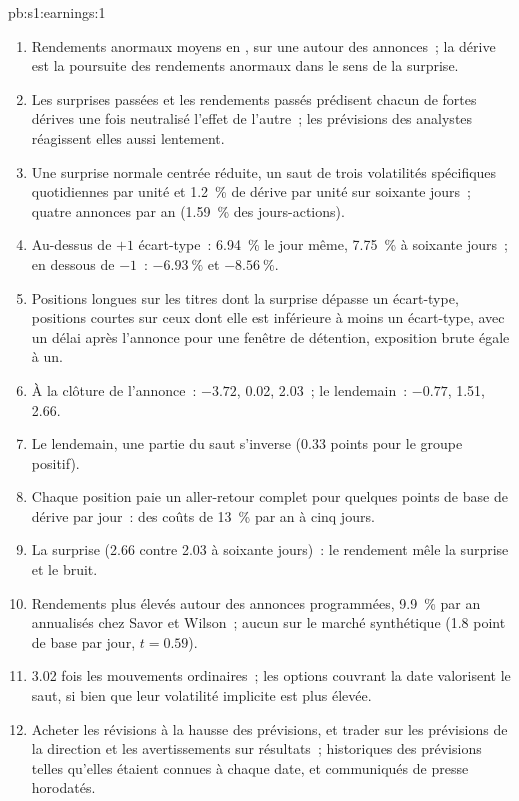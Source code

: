 \begin{solution}{pb:s1:earnings:1}
\begin{enumerate}
\item Rendements anormaux moyens en , sur une  autour des annonces~; la dérive est la poursuite des rendements anormaux dans le sens de la surprise.
\item Les surprises passées et les rendements passés prédisent chacun de fortes dérives une fois neutralisé l'effet de l'autre~; les prévisions des analystes réagissent elles aussi lentement.
\item Une surprise normale centrée réduite, un saut de trois volatilités spécifiques quotidiennes par unité et 1.2~\% de dérive par unité sur soixante jours~; quatre annonces par an
(1.59~\% des jours-actions).
\item Au-dessus de $+1$ écart-type~: 6.94~\% le jour même, 7.75~\% à soixante jours~; en dessous de $-1$~: $-6.93~\%$ et $-8.56~\%$.
\item Positions longues sur les titres dont la surprise dépasse un écart-type, positions courtes sur ceux dont elle est inférieure à moins un écart-type, avec un délai après l'annonce pour une fenêtre de détention,
exposition brute égale à un.
\item À la clôture de l'annonce~: $-3.72$, 0.02, 2.03~; le lendemain~: $-0.77$, 1.51, 2.66.
\item Le lendemain, une partie du saut s'inverse (0.33 points pour le groupe positif).
\item Chaque position paie un aller-retour complet pour quelques points de base de dérive par jour~: des coûts de 13~\% par an à cinq jours.
\item La surprise (2.66 contre 2.03 à soixante jours)~: le rendement mêle la surprise et le bruit.
\item Rendements plus élevés autour des annonces programmées, 9.9~\% par an annualisés chez Savor et Wilson~; aucun sur le marché synthétique (1.8 point de base par jour, $t =
0.59$).
\item 3.02 fois les mouvements ordinaires~; les options couvrant la date valorisent le saut, si bien que leur volatilité implicite est plus élevée.
\item Acheter les révisions à la hausse des prévisions, et trader sur les prévisions de la direction et les avertissements sur résultats~; historiques des prévisions telles qu'elles étaient connues à chaque date, et communiqués de presse horodatés.

\end{enumerate}
\end{solution}

